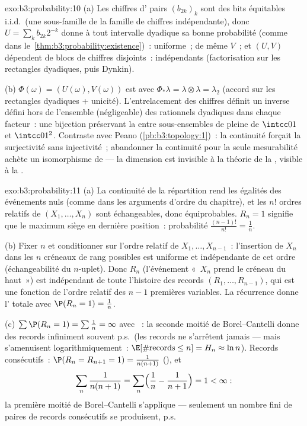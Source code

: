 \begin{solution}{exo:b3:probability:10}
(a) Les chiffres d' pairs $(b_{2k})_k$ sont des bits
équitables i.i.d.\ (une sous-famille de la famille de
chiffres indépendante), donc $U = \sum_kb_{2k}2^{-k}$ donne
à tout intervalle dyadique sa bonne probabilité (comme dans
le~\cref{thm:b3:probability:existence})~: uniforme~; de même
$V$~; et $(U, V)$ dépendent de blocs de chiffres
disjoints~: indépendants (factorisation sur les rectangles
dyadiques, puis Dynkin).

(b) $\Phi(\omega) = (U(\omega), V(\omega))$ est 
avec $\Phi_*\lambda = \lambda\otimes\lambda = \lambda_2$
(accord sur les rectangles dyadiques + unicité).
L'entrelacement des chiffres définit un inverse défini hors
de l'ensemble (négligeable) des rationnels dyadiques dans
chaque facteur~: une bijection préservant la  entre
sous-ensembles de  pleine de $\intcc01$ et
$\intcc01^2$. Contraste avec Peano
(\cref{pb:b3:topology:1})~: la continuité forçait la
surjectivité sans injectivité~; abandonner la continuité
pour la seule mesurabilité achète un isomorphisme de 
--- la dimension est invisible à la théorie de la ,
visible à la .
\end{solution}

\begin{solution}{exo:b3:probability:11}
(a) La continuité de la répartition rend les égalités des
événements nuls (comme dans les arguments d'ordre du
chapitre), et les $n!$ ordres relatifs de $(X_1, \dots,
X_n)$ sont échangeables, donc équiprobables. $R_n = 1$
signifie que le maximum siège en dernière position~:
probabilité $\frac{(n-1)!}{n!} = \frac1n$.

(b) Fixer $n$ et conditionner sur l'ordre relatif de $X_1,
\dots, X_{n-1}$~: l'insertion de $X_n$ dans les $n$
créneaux de rang possibles est uniforme et indépendante de
cet ordre (échangeabilité du $n$-uplet). Donc $R_n$
(l'événement «~$X_n$ prend le créneau du haut~») est
indépendant de toute l'histoire des records $(R_1, \dots,
R_{n-1})$, qui est une fonction de l'ordre relatif des $n
- 1$ premières variables. La récurrence donne
l' totale avec $\P(R_n = 1) = \frac1n$.

(c) $\sum\P(R_n = 1) = \sum\frac1n = \infty$ avec
~: la seconde moitié de Borel--Cantelli donne
des records infiniment souvent p.s.\ (les records ne
s'arrêtent jamais --- mais s'amenuisent
logarithmiquement~: $\E[\#\text{records} \leq n] = H_n
\approx \ln n$). Records consécutifs~: $\P(R_n = R_{n+1} =
1) = \frac1{n(n+1)}$ (), et
\[
\sum_n\frac1{n(n+1)} = \sum_n\Bigl(\frac1n -
\frac1{n+1}\Bigr) = 1 < \infty :
\]
la première moitié de Borel--Cantelli s'applique ---
seulement un nombre fini de paires de records consécutifs
se produisent, p.s.
\end{solution}

